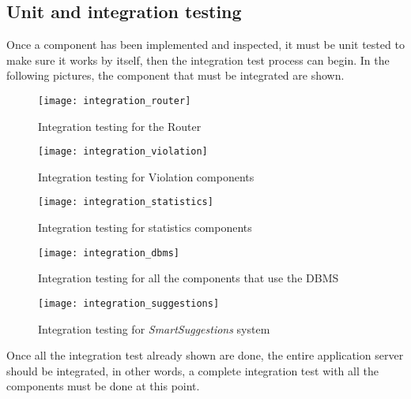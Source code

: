 \subsection{Unit and integration testing}
Once a component has been implemented and inspected, it must be unit tested to
make sure it works by itself, then the integration test process can begin.
In the following pictures, the component that must be integrated are shown.

\begin{figure}[ht]
    \centering
    \texttt{[image: integration\_router]}
    \caption{Integration testing for the Router}
    \label{fig:integration_router}
\end{figure}

\begin{figure}[ht]
    \centering
    \texttt{[image: integration\_violation]}
    \caption{Integration testing for Violation components}
    \label{fig:integration_violation}
\end{figure}

\begin{figure}[ht]
    \centering
    \texttt{[image: integration\_statistics]}
    \caption{Integration testing for statistics components}
    \label{fig:integration_statistics}
\end{figure}

\begin{figure}[ht]
    \centering
    \texttt{[image: integration\_dbms]}
    \caption{Integration testing for all the components that use the DBMS}
    \label{fig:integration_dbms}
\end{figure}
\clearpage
\begin{figure}[ht]
    \centering
    \texttt{[image: integration\_suggestions]}
    \caption{Integration testing for \emph{SmartSuggestions} system}
    \label{fig:integration_suggestions}
\end{figure}

Once all the integration test already shown are done, the entire application
server should be integrated, in other words, a complete integration test with
all the components must be done at this point.